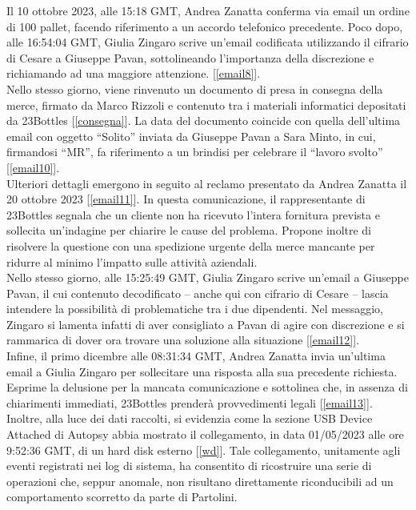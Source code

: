 Il 10 ottobre 2023, alle 15:18 GMT, Andrea Zanatta conferma via email un ordine di 100 pallet, facendo riferimento a un accordo telefonico precedente. Poco dopo, alle 16:54:04 GMT, Giulia Zingaro scrive un’email codificata utilizzando il cifrario di Cesare a Giuseppe Pavan, sottolineando l’importanza della discrezione e richiamando ad una maggiore attenzione. [\ref{email8}].\\
Nello stesso giorno, viene rinvenuto un documento di presa in consegna della merce, firmato da Marco Rizzoli e contenuto tra i materiali informatici depositati da 23Bottles [\ref{consegna}]. La data del documento coincide con quella dell’ultima email con oggetto “Solito” inviata da Giuseppe Pavan a Sara Minto, in cui, firmandosi “MR”, fa riferimento a un brindisi per celebrare il “lavoro svolto” [\ref{email10}].\vspace{14pt}\\
Ulteriori dettagli emergono in seguito al reclamo presentato da Andrea Zanatta il 20 ottobre 2023 [\ref{email11}]. In questa comunicazione, il rappresentante di 23Bottles segnala che un cliente non ha ricevuto l’intera fornitura prevista e sollecita un’indagine per chiarire le cause del problema. Propone inoltre di risolvere la questione con una spedizione urgente della merce mancante per ridurre al minimo l’impatto sulle attività aziendali.\\
Nello stesso giorno, alle 15:25:49 GMT, Giulia Zingaro scrive un’email a Giuseppe Pavan, il cui contenuto decodificato -- anche qui con cifrario di Cesare -- lascia intendere la possibilità di problematiche tra i due dipendenti. Nel messaggio, Zingaro si lamenta infatti di aver consigliato a Pavan di agire con discrezione e si rammarica di dover ora trovare una soluzione alla situazione [\ref{email12}].\vspace{14pt}\\
Infine, il primo dicembre alle 08:31:34 GMT, Andrea Zanatta invia un’ultima email a Giulia Zingaro per sollecitare una risposta alla sua precedente richiesta. Esprime la delusione per la mancata comunicazione e sottolinea che, in assenza di chiarimenti immediati, 23Bottles prenderà provvedimenti legali [\ref{email13}].\vspace{14pt}\\
Inoltre, alla luce dei dati raccolti, si evidenzia come la sezione USB Device Attached di Autopsy abbia mostrato il collegamento, in data 01/05/2023 alle ore 9:52:36 GMT, di un hard disk esterno [\ref{wd}]. Tale collegamento, unitamente agli eventi registrati nei log di sistema, ha consentito di ricostruire una serie di operazioni che, seppur anomale, non risultano direttamente riconducibili ad un comportamento scorretto da parte di Partolini.\vspace{14pt}\\
